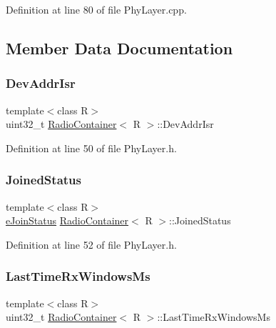 Definition at line 80 of file Phy\+Layer.\+cpp.



\subsection{Member Data Documentation}
\mbox{\label{class_radio_container_a3fce662f22e5d0beaf3b25df353c0bae}} 
\subsubsection{\texorpdfstring{Dev\+Addr\+Isr}{DevAddrIsr}}
{\footnotesize\ttfamily template$<$class R$>$ \\
uint32\+\_\+t \mbox{\hyperlink{class_radio_container}{Radio\+Container}}$<$ R $>$\+::Dev\+Addr\+Isr}



Definition at line 50 of file Phy\+Layer.\+h.

\mbox{\label{class_radio_container_a4c19319bc32e8f18dc42b70f852cd24e}} 
\subsubsection{\texorpdfstring{Joined\+Status}{JoinedStatus}}
{\footnotesize\ttfamily template$<$class R$>$ \\
\mbox{\hyperlink{_define_8h_abe3daafdb4fec314926c12003b3ad390}{e\+Join\+Status}} \mbox{\hyperlink{class_radio_container}{Radio\+Container}}$<$ R $>$\+::Joined\+Status}



Definition at line 52 of file Phy\+Layer.\+h.

\mbox{\label{class_radio_container_a087adc0271190a23c893774d1a9f9dc0}} 
\subsubsection{\texorpdfstring{Last\+Time\+Rx\+Windows\+Ms}{LastTimeRxWindowsMs}}
{\footnotesize\ttfamily template$<$class R$>$ \\
uint32\+\_\+t \mbox{\hyperlink{class_radio_container}{Radio\+Container}}$<$ R $>$\+::Last\+Time\+Rx\+Windows\+Ms}



